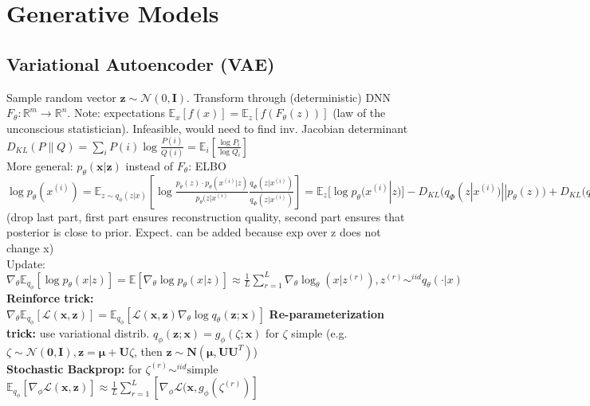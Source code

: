\section{Generative Models}
\subsection*{Variational Autoencoder (VAE)}
Sample random vector $\mathbf{z} \sim \mathcal{N}(0,\mathbf{I})$. Transform through (deterministic) DNN $F_\theta : \mathbb{R}^m \to \mathbb{R}^n$. Note: expectations $\mathbb{E}_x[f(x)] = \mathbb{E}_z [f(F_\theta(z))]$ (law of the unconscious statistician). Infeasible, would need to find inv. Jacobian determinant\\
$D_{KL}(P\|Q)=\sum_i P(i)\log\frac{P(i)}{Q(i)}=\mathbb{E}_i [\frac{\log P_i}{\log Q_i}]$ \\
More general: $p_\theta (\mathbf{x}|\mathbf{z}) $ instead of $F_\theta$: ELBO \\
$\log p_\theta(x^{(i)})
= \mathbb{E}_{z \sim q_\phi (z|x)} \left[\log \frac{p_\theta(z) \cdot p_\theta(x^{(i)}|z)}{p_\theta(z|x^{(i)}}\frac{q_\Phi(z|x^{(i)})}{q_\Phi(z|x^{(i)})} \right] \allowbreak
= \mathbb{E}_z[\log p_\theta (x^{(i)}|z)] - D_{KL}(q_\Phi(z|x^{(i)}) || p_\theta(z)) + D_{KL}(q_\Phi(z|x^{(i)}) || p_\theta(z|x^{(i)})$ (drop last part, first part ensures reconstruction quality, second part ensures that posterior is close to prior. Expect. can be added because exp over z does not change x)\\
Update: $\nabla_\theta \mathbb{E}_{q_\phi}[\log p_\theta(x|z)] = \mathbb{E}[\nabla_\theta \log p_\theta(x|z)] \allowbreak \approx \frac 1 L \sum_{r=1}^L \nabla_\theta \log_\theta(x|z^{(r)}), z^{(r)} \sim^{iid} q_\theta (\cdot | x) $\\
\textbf{Reinforce trick:}\\ $\nabla_\theta\mathbb{E}_{q_\phi}[\mathcal{L}(\mathbf{x}, \mathbf{z})] = \mathbb{E}_{q_\phi}[\mathcal{L}(\mathbf{x}, \mathbf{z}) \nabla_\theta\log q_\theta(\mathbf{z};\mathbf{x})]$
\textbf{Re-parameterization trick:} use variational distrib. $q_\phi(\mathbf{z};\mathbf{x})=g_\phi(\zeta;\mathbf{x})$ for $\zeta$ simple (e.g. $\zeta \sim \mathcal{N}(\mathbf{0},\mathbf{I}), \mathbf{z}=\mathbf{\mu} + \mathbf{U}\zeta$, then $\mathbf{z}\sim \mathbf{N}(\mathbf{\mu}, \mathbf{UU}^T)$)\\
\textbf{Stochastic Backprop:} for $\zeta^{(r)} \sim^{iid} \text{simple}$ \\
$\mathbb{E}_{q_\phi}[\nabla_\phi\mathcal{L}(\mathbf{x}, \mathbf{z})] \approx \frac 1 L \sum_{r=1}^L [\nabla_\phi \mathcal{L}(\mathbf{x}, g_\phi(\zeta^{(r)})] $ 
